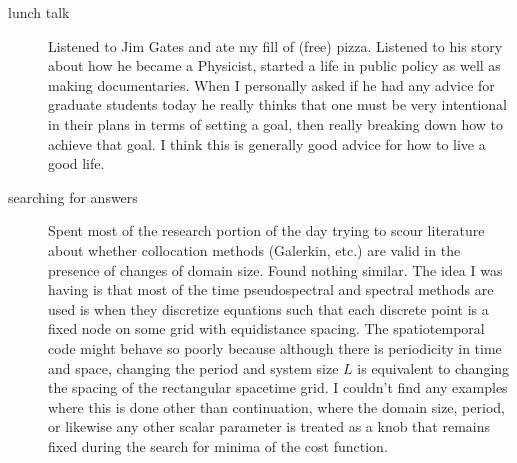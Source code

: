 \begin{description}
{\begin{description}
\item[lunch talk]
Listened to Jim Gates and ate my fill of (free) pizza. Listened to his story about how he became a Physicist, started a life in public policy as well as
making documentaries. When I personally asked if he had any advice for graduate students today he really thinks that one must be very intentional in their plans in terms of setting a goal, then really breaking down how to achieve that goal. I think this is generally good advice for how to live a good life.

\item[searching for answers]
Spent most of the research portion of the day trying to scour literature about
whether collocation methods (Galerkin, etc.) are valid in the presence of
changes of domain size. Found nothing similar. The idea I was having is that
most of the time pseudospectral and spectral methods are used is when they
discretize equations such that each discrete point is a fixed node on some grid
with equidistance spacing. The spatiotemporal code might behave so poorly
because although there is periodicity in time and space, changing the period
and system size $L$ is equivalent to changing the spacing of the rectangular
spacetime grid. I couldn't find any examples where this is done other than
continuation, where the domain size, period, or likewise any other scalar
parameter is treated as a knob that remains fixed during the search for minima
of the cost function.

\end{description}
}

\end{description}
